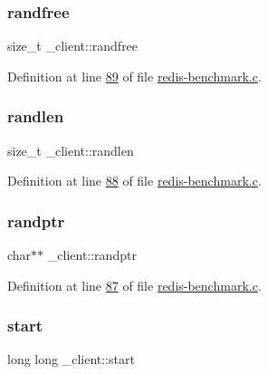 \subsubsection{\texorpdfstring{randfree}{randfree}}
{\footnotesize\ttfamily size\+\_\+t \+\_\+client\+::randfree}



Definition at line \hyperlink{redis-benchmark_8c_source_l00089}{89} of file \hyperlink{redis-benchmark_8c_source}{redis-\/benchmark.\+c}.

\mbox{\label{struct__client_a60cb677f41011ed39ef369bdee286717}} 
\subsubsection{\texorpdfstring{randlen}{randlen}}
{\footnotesize\ttfamily size\+\_\+t \+\_\+client\+::randlen}



Definition at line \hyperlink{redis-benchmark_8c_source_l00088}{88} of file \hyperlink{redis-benchmark_8c_source}{redis-\/benchmark.\+c}.

\mbox{\label{struct__client_ac87622a714444d3ebbe429c468c579ff}} 
\subsubsection{\texorpdfstring{randptr}{randptr}}
{\footnotesize\ttfamily char$\ast$$\ast$ \+\_\+client\+::randptr}



Definition at line \hyperlink{redis-benchmark_8c_source_l00087}{87} of file \hyperlink{redis-benchmark_8c_source}{redis-\/benchmark.\+c}.

\mbox{\label{struct__client_a446ec52a7b7272d00f0e8078180bfe70}} 
\subsubsection{\texorpdfstring{start}{start}}
{\footnotesize\ttfamily long long \+\_\+client\+::start}



